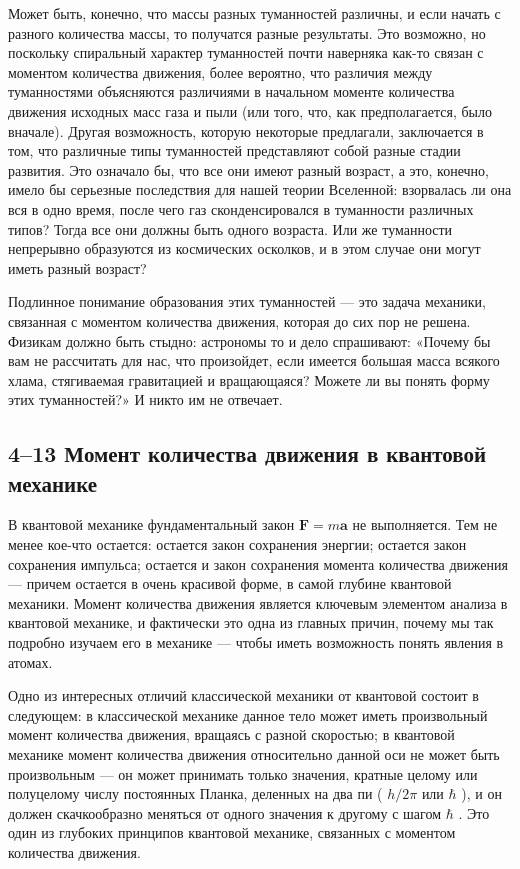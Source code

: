 \documentclass[11pt,oneside]{article}
\providecommand{\FLPF}{\mathbf{F}}
\providecommand{\FLPa}{\mathbf{a}}
\begin{document}
Может быть, конечно, что массы разных туманностей различны, и если начать с разного количества массы, то получатся разные результаты. Это возможно, но поскольку спиральный характер туманностей почти наверняка как-то связан с моментом количества движения, более вероятно, что различия между туманностями объясняются различиями в начальном моменте количества движения исходных масс газа и пыли (или того, что, как предполагается, было вначале). Другая возможность, которую некоторые предлагали, заключается в том, что различные типы туманностей представляют собой разные стадии развития. Это означало бы, что все они имеют разный возраст, а это, конечно, имело бы серьезные последствия для нашей теории Вселенной: взорвалась ли она вся в одно время, после чего газ сконденсировался в туманности различных типов? Тогда все они должны быть одного возраста. Или же туманности непрерывно образуются из космических осколков, и в этом случае они могут иметь разный возраст?\par

Подлинное понимание образования этих туманностей --- это задача механики, связанная с моментом количества движения, которая до сих пор не решена. Физикам должно быть стыдно: астрономы то и дело спрашивают: «Почему бы вам не рассчитать для нас, что произойдет, если имеется большая масса всякого хлама, стягиваемая гравитацией и вращающаяся? Можете ли вы понять форму этих туманностей?» И никто им не отвечает.\par

\subsection*{4--13 Момент количества движения в квантовой механике}

В квантовой механике фундаментальный закон \(\FLPF = m\FLPa\) не выполняется. Тем не менее кое-что остается: остается закон сохранения энергии; остается закон сохранения импульса; остается и закон сохранения момента количества движения --- причем остается в очень красивой форме, в самой глубине квантовой механики. Момент количества движения является ключевым элементом анализа в квантовой механике, и фактически это одна из главных причин, почему мы так подробно изучаем его в механике --- чтобы иметь возможность понять явления в атомах.\par

Одно из интересных отличий классической механики от квантовой состоит в следующем: в классической механике данное тело может иметь произвольный момент количества движения, вращаясь с разной скоростью; в квантовой механике момент количества движения относительно данной оси не может быть произвольным --- он может принимать только значения, кратные целому или полуцелому числу постоянных Планка, деленных на два пи ( \(h/2\pi\) или \(\hbar\) ), и он должен скачкообразно меняться от одного значения к другому с шагом \(\hbar\) . Это один из глубоких принципов квантовой механике, связанных с моментом количества движения.\par
\end{document}
